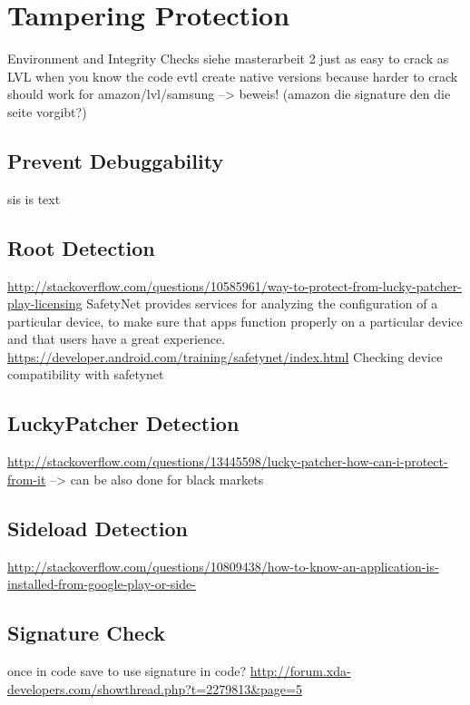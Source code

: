 \section{Tampering Protection}\label{section:tampering}
Environment and Integrity Checks\newline
siehe masterarbeit 2\newline
just as easy to crack as LVL when you know the code\newline
evtl create native versions because harder to crack\newline
should work for amazon/lvl/samsung --> beweis! (amazon die signature den die seite vorgibt?)\newline


\subsection{Prevent Debuggability}\label{subsection:tampering-debuggable}
sis is text
\subsection{Root Detection}\label{subsection:tampering-root}
\url{http://stackoverflow.com/questions/10585961/way-to-protect-from-lucky-patcher-play-licensing}\newline
SafetyNet provides services for analyzing the configuration of a particular device, to make sure that apps function properly on a particular device and that users have a great experience. \url{https://developer.android.com/training/safetynet/index.html} Checking device compatibility with safetynet\newline
\subsection{LuckyPatcher Detection}\label{subsection:tampering-luckypatcher}
\url{http://stackoverflow.com/questions/13445598/lucky-patcher-how-can-i-protect-from-it}\newline
--> can be also done for black markets
\subsection{Sideload Detection}\label{subsection:tampering-sideload}
\url{http://stackoverflow.com/questions/10809438/how-to-know-an-application-is-installed-from-google-play-or-side-}
\subsection{Signature Check}\label{subsection:tampering-signature}
once in code \newline
save to use signature in code?\newline
\url{http://forum.xda-developers.com/showthread.php?t=2279813&page=5}\newline

